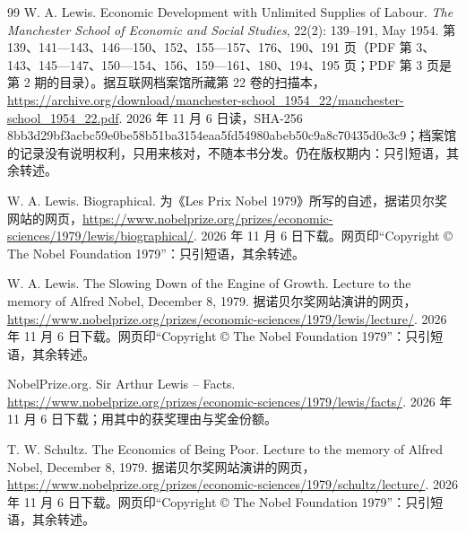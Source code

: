 \begin{thebibliography}{99}
 W. A. Lewis. Economic Development with Unlimited Supplies of Labour. \emph{The Manchester School of Economic and Social Studies}, 22(2): 139--191, May 1954. 第 139、141—143、146—150、152、155—157、176、190、191 页（PDF 第 3、143、145—147、150—154、156、159—161、180、194、195 页；PDF 第 3 页是第 2 期的目录）。据互联网档案馆所藏第 22 卷的扫描本，\url{https://archive.org/download/manchester-school_1954_22/manchester-school_1954_22.pdf}. 2026 年 11 月 6 日读，SHA-256 8bb3d29bf3acbc59e0be58b51ba3154eaa5fd54980abeb50c9a8c70435d0e3c9；档案馆的记录没有说明权利，只用来核对，不随本书分发。仍在版权期内：只引短语，其余转述。

 W. A. Lewis. Biographical. 为《Les Prix Nobel 1979》所写的自述，据诺贝尔奖网站的网页，\url{https://www.nobelprize.org/prizes/economic-sciences/1979/lewis/biographical/}. 2026 年 11 月 6 日下载。网页印“Copyright © The Nobel Foundation 1979”：只引短语，其余转述。

 W. A. Lewis. The Slowing Down of the Engine of Growth. Lecture to the memory of Alfred Nobel, December 8, 1979. 据诺贝尔奖网站演讲的网页，\url{https://www.nobelprize.org/prizes/economic-sciences/1979/lewis/lecture/}. 2026 年 11 月 6 日下载。网页印“Copyright © The Nobel Foundation 1979”：只引短语，其余转述。

 NobelPrize.org. Sir Arthur Lewis -- Facts. \url{https://www.nobelprize.org/prizes/economic-sciences/1979/lewis/facts/}. 2026 年 11 月 6 日下载；用其中的获奖理由与奖金份额。

 T. W. Schultz. The Economics of Being Poor. Lecture to the memory of Alfred Nobel, December 8, 1979. 据诺贝尔奖网站演讲的网页，\url{https://www.nobelprize.org/prizes/economic-sciences/1979/schultz/lecture/}. 2026 年 11 月 6 日下载。网页印“Copyright © The Nobel Foundation 1979”：只引短语，其余转述。


\end{thebibliography}
